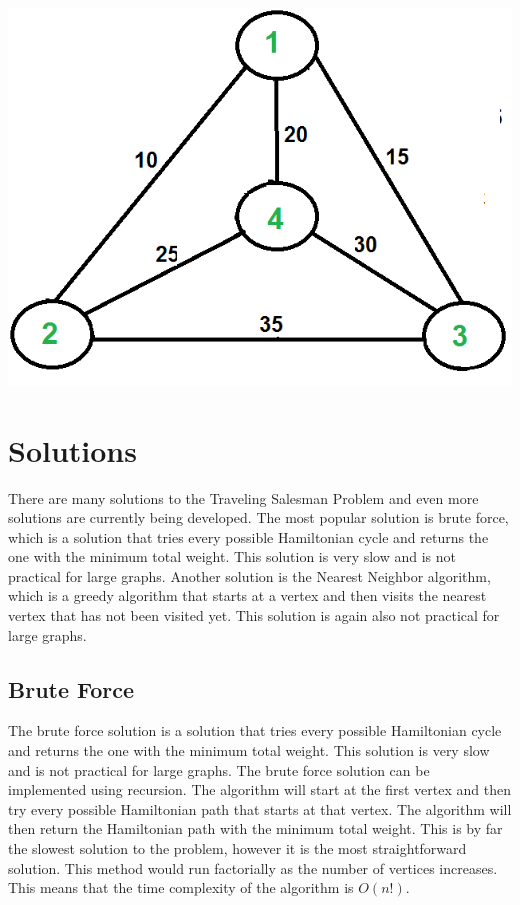 \documentclass[12pt]{article}
\begin{document}
\begin{center}
    \includegraphics[scale = .5]{images/graph1.png}
\end{center}

\section{Solutions}
There are many solutions to the Traveling Salesman Problem and even more solutions are currently being developed. The most popular solution is brute force, which is a solution that tries every possible Hamiltonian cycle and returns the one with the minimum total weight. This solution
is very slow and is not practical for large graphs. Another solution is
the Nearest Neighbor algorithm, which is a greedy algorithm that starts
at a vertex and then visits the nearest vertex that has not been visited
yet. This solution is again also not practical for large graphs.

\subsection{Brute Force}
The brute force solution is a solution that tries every possible Hamiltonian
cycle and returns the one with the minimum total weight. This solution
is very slow and is not practical for large graphs. The brute force solution
can be implemented using recursion. The algorithm will start at the first
vertex and then try every possible Hamiltonian path that starts at that
vertex. The algorithm will then return the Hamiltonian path with the minimum
total weight. This is by far the slowest solution to the problem, however
it is the most straightforward solution. This method would run factorially
as the number of vertices increases. This means that the time complexity
of the algorithm is $O(n!)$. 
\end{document}

